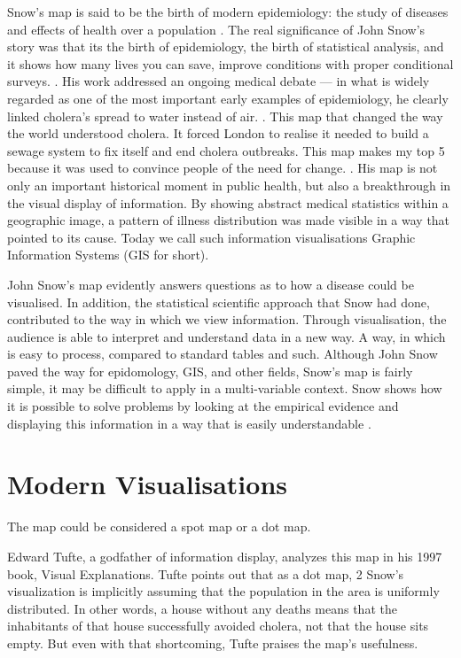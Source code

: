\documentclass[12pt]{article}
\begin{document}
Snow's map is said to be the birth of modern epidemiology: the study of diseases and effects of health over a population \cite{youtube}. The real significance of John Snow's story was that its the birth of epidemiology, the birth of statistical analysis, and it shows how many lives you can save, improve conditions with proper conditional surveys. \cite{youtube}. His work addressed an ongoing medical debate — in what is widely regarded as one of the most important early examples of epidemiology, he clearly linked cholera’s spread to water instead of air. \cite{blog}. This map that changed the way the world understood cholera. It forced London to realise it needed to build a sewage system to fix itself and end cholera outbreaks. This map makes my top 5 because it was used to convince people of the need for change. \cite{top5}. His map is not only an important historical moment in public health, but also a breakthrough in the visual display of information. By showing abstract medical statistics within a geographic image, a pattern of illness distribution was made visible in a way that pointed to its cause. Today we call such information visualisations Graphic Information Systems (GIS for short). \cite{test}

John Snow's map evidently answers questions as to how a disease could be visualised. In addition, the statistical scientific approach that Snow had done, contributed to the way in which we view information. Through visualisation, the audience is able to interpret and understand data in a new way. A way, in which is easy to process, compared to standard tables and such. Although John Snow paved the way for epidomology, GIS, and other fields, Snow's map is fairly simple, it may be difficult to apply in a multi-variable context. Snow shows how it is possible to solve problems by looking at the empirical evidence and displaying this information in a way that is easily understandable \cite{tedtalk}.

\section{Modern Visualisations}
The map could be considered a spot map or a dot map. 

Edward Tufte, a godfather of information display, analyzes this map in his 1997 book, Visual Explanations. Tufte points out that as a dot map, 2 Snow’s visualization is implicitly assuming that the population in the area is uniformly distributed. In other words, a house without any deaths means that the inhabitants of that house successfully avoided cholera, not that the house sits empty. But even with that shortcoming, Tufte praises the map’s usefulness. \cite{blog}
\end{document}
